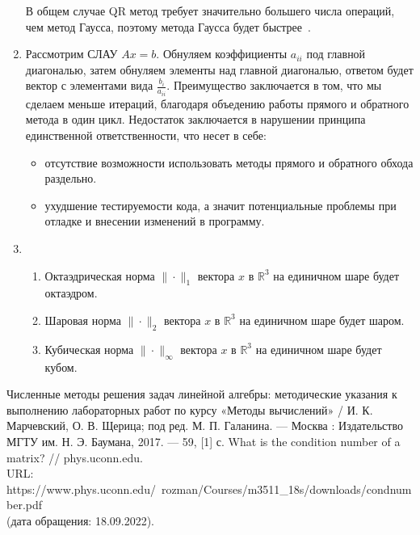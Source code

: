 \documentclass[12pt, a4paper]{article}
\begin{document}
\begin{enumerate}
	В общем случае QR метод требует значительно большего числа операций, чем метод Гаусса, поэтому метода Гаусса будет быстрее~\cite{MetVich}.
	\item Рассмотрим СЛАУ $Ax = b$. Обнуляем коэффициенты $a_{ii}$ под главной диагональю, затем обнуляем элементы над главной диагональю, ответом будет вектор с элементами вида $\frac {b_i}{a_{ii}}$. Преимущество заключается в том, что мы сделаем меньше итераций, благодаря объедению работы прямого и обратного метода в один цикл. Недостаток заключается в нарушении принципа единственной ответственности, что несет в себе: 
	\begin{itemize}
		\item отсутствие возможности использовать методы прямого и обратного обхода раздельно.
		\item ухудшение тестируемости кода, а значит потенциальные проблемы при отладке и внесении изменений в программу.
	\end{itemize}
	\item 
		\begin{enumerate}
		\item Октаэдрическая норма $\|\cdot\|_1$ вектора $x$ в $\mathbb{R}^3$ на единичном шаре будет октаэдром.
		\item Шаровая норма $\|\cdot\|_2$ вектора $x$ в $\mathbb{R}^3$ на единичном шаре будет шаром.
		\item Кубическая норма $\|\cdot\|_\infty$ вектора $x$ в $\mathbb{R}^3$ на единичном шаре будет кубом.
		\end{enumerate}
\end{enumerate}


\newpage

\begin{thebibliography}{5}
	 Численные методы решения задач линейной алгебры:
	методические указания к выполнению лабораторных работ по
	курсу «Методы вычислений» / И. К. Марчевский, О. В. Щерица; под ред. М. П. Галанина. — Москва : Издательство МГТУ
	им. Н. Э. Баумана, 2017. — 59, [1] с.
	What is the condition number of a matrix? // phys.uconn.edu.\\
	URL: https://www.phys.uconn.edu/~rozman/Courses/m3511\_18s/downloads/condnumber.pdf \\
	(дата обращения: 18.09.2022).
	
\end{thebibliography}
\end{document}
